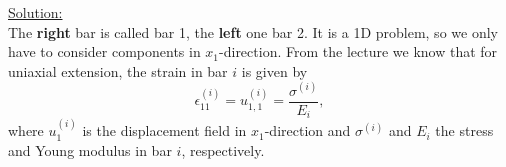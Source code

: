 \documentclass{article}
\newcommand{\ee}{\end{equation}}
\newcommand{\be}{\begin{equation}}
\begin{document}
\begin{enumerate}
\underline{Solution:} \\

% 

The \textbf{right} bar is called bar 1, the \textbf{left} one bar 2. It is a 1D problem, so we only have to consider components in $x_1$-direction. From the
lecture we know that for uniaxial extension, the strain in bar $i$ is given by
\be
\epsilon_{11}^{(i)} = u^{(i)}_{1,1} = \frac{\sigma^{(i)}}{E_i},
\ee
where $u_1^{(i)}$ is the displacement field in $x_1$-direction and $\sigma^{(i)}$ and $E_i$ the stress and Young modulus in bar $i$, respectively.


\end{enumerate}
\end{document}
